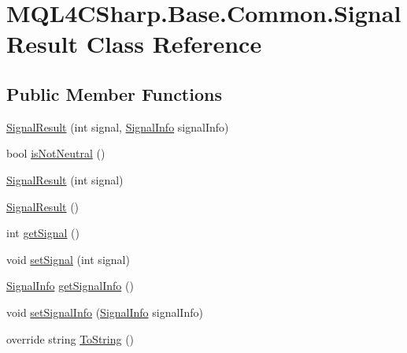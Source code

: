 \hypertarget{class_m_q_l4_c_sharp_1_1_base_1_1_common_1_1_signal_result}{}\section{M\+Q\+L4\+C\+Sharp.\+Base.\+Common.\+Signal\+Result Class Reference}
\label{class_m_q_l4_c_sharp_1_1_base_1_1_common_1_1_signal_result}
\subsection*{Public Member Functions}
\begin{DoxyCompactItemize}
\item 
\hyperlink{class_m_q_l4_c_sharp_1_1_base_1_1_common_1_1_signal_result_a53986e0850468b5f21ac6215da64cf2a}{Signal\+Result} (int signal, \hyperlink{class_m_q_l4_c_sharp_1_1_base_1_1_common_1_1_signal_info}{Signal\+Info} signal\+Info)
\item 
bool \hyperlink{class_m_q_l4_c_sharp_1_1_base_1_1_common_1_1_signal_result_af295068fe9427ab13a0d2b4f6e737a39}{is\+Not\+Neutral} ()
\item 
\hyperlink{class_m_q_l4_c_sharp_1_1_base_1_1_common_1_1_signal_result_a754056867213c43a33d10a5d6b4ffacd}{Signal\+Result} (int signal)
\item 
\hyperlink{class_m_q_l4_c_sharp_1_1_base_1_1_common_1_1_signal_result_a584b60638406d15fc86cfaafe4f8f8b2}{Signal\+Result} ()
\item 
int \hyperlink{class_m_q_l4_c_sharp_1_1_base_1_1_common_1_1_signal_result_a1a003fbc7aaccd6dd4e894e64f91004c}{get\+Signal} ()
\item 
void \hyperlink{class_m_q_l4_c_sharp_1_1_base_1_1_common_1_1_signal_result_a1fcdccd48c0b4ecd34b8970c1a667a11}{set\+Signal} (int signal)
\item 
\hyperlink{class_m_q_l4_c_sharp_1_1_base_1_1_common_1_1_signal_info}{Signal\+Info} \hyperlink{class_m_q_l4_c_sharp_1_1_base_1_1_common_1_1_signal_result_a413b0c65c59c6abe40b90897fc61f2d1}{get\+Signal\+Info} ()
\item 
void \hyperlink{class_m_q_l4_c_sharp_1_1_base_1_1_common_1_1_signal_result_a0f583e1b8f20dc947ac2f4c21223d6b3}{set\+Signal\+Info} (\hyperlink{class_m_q_l4_c_sharp_1_1_base_1_1_common_1_1_signal_info}{Signal\+Info} signal\+Info)
\item 
override string \hyperlink{class_m_q_l4_c_sharp_1_1_base_1_1_common_1_1_signal_result_aca6988032fe987548508e3237a36f53d}{To\+String} ()
\end{DoxyCompactItemize}
